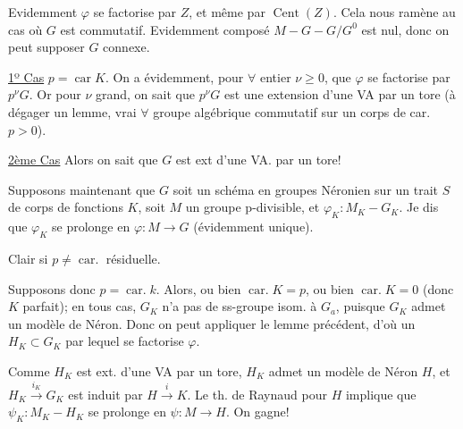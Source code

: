 Evidemment $\varphi$ se factorise par  $Z$, et même par $\operatorname{Cent}(Z)$. Cela nous ramène au cas où $G$ est commutatif. Evidemment   composé $M\mathbin{-}G\mathbin{-}G/G^0$ est nul, donc on peut supposer $G$ connexe.

\uline{1º Cas} $p=\operatorname{car}K$. On a évidemment, pour $\forall$ entier $\nu\geq0$, que $\varphi$ se factorise par $p^\nu G$. Or pour $\nu$ grand, on sait  que $p^\nu G$ est une extension d'une VA par un tore (à dégager un lemme, vrai $\forall$ groupe algébrique commutatif sur un corps de car. $p>0$).

\uline{2ème Cas}  
Alors on sait que $G$ est ext d'une VA. par un tore!



Supposons maintenant que $G$ soit un schéma en groupes Néronien sur un trait $S$ de corps de fonctions $K$, soit $M$ un groupe p-divisible, et $\varphi_K:M_K\mathbin{-}G_K$. Je dis que $\varphi_K$ se prolonge en $\varphi:M\longrightarrow G$ (évidemment unique).

Clair si $p\ne\operatorname{car.}$ résiduelle.

Supposons donc $p=\operatorname{car.}k$. Alors, ou bien $\operatorname{car.}K=p$, ou bien $\operatorname{car.}K=0$ (donc $K$ parfait); en tous cas, $G_K$ n'a pas de ss-groupe isom. à $G_a$, puisque $G_K$ admet un modèle de Néron. Donc on peut appliquer le lemme précédent,  d'où un $H_K\subset G_K$ par lequel se factorise $\varphi$.

Comme $H_K$ est ext. d'une VA par un tore, $H_K$ admet un modèle de Néron $H$, et $H_K\xrightarrow{i_K}G_K$ est induit par $H\xrightarrow{i}K$. Le th. de Raynaud pour $H$ implique que $\psi_K:M_K\mathbin{-}H_K$ se prolonge en $\psi:M\longrightarrow H$. On gagne!

